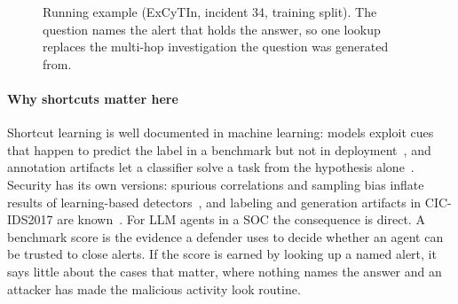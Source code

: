 \begin{figure}[t]
\centering
{}
\caption{Running example (ExCyTIn, incident 34, training split). The question names the alert that holds the answer, so one lookup replaces the multi-hop investigation the question was generated from.}
\label{fig:example}
\end{figure}

\paragraph{Why shortcuts matter here} Shortcut learning is well documented in machine learning: models exploit cues that happen to predict the label in a benchmark but not in deployment~\citep{geirhos2020shortcut}, and annotation artifacts let a classifier solve a task from the hypothesis alone~\citep{gururangan2018artifacts}. Security has its own versions: spurious correlations and sampling bias inflate results of learning-based detectors~\citep{arp2022dos}, and labeling and generation artifacts in CIC-IDS2017 are known~\citep{engelen2021cicids}. For LLM agents in a SOC the consequence is direct. A benchmark score is the evidence a defender uses to decide whether an agent can be trusted to close alerts. If the score is earned by looking up a named alert, it says little about the cases that matter, where nothing names the answer and an attacker has made the malicious activity look routine.
